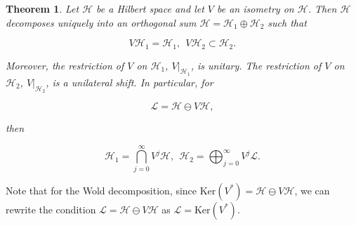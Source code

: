\documentclass[10pt, reqno]{amsart}
\newtheorem{theorem}{Theorem}[section]
\theoremstyle{definition}
\numberwithin{equation}{section}
\begin{document}
\begin{theorem}{}\label{Wold}
    Let $\mathcal{H}$ be a Hilbert space and let $V$ be an isometry on $\mathcal{H}$. Then $\mathcal{H}$ decomposes uniquely into an orthogonal sum $\mathcal{H}=\mathcal{H}_{1}\oplus \mathcal{H}_{2}$ such that

    $$V\mathcal{H}_{1}=\mathcal{H}_{1},~~V\mathcal{H}_{2}\subset \mathcal{H}_{2}.$$

\noindent Moreover, the restriction of $V$ on $\mathcal{H}_{1}$, $V|_{\mathcal{H}_{1}}$, is unitary. The restriction of $V$ on $\mathcal{H}_{2}$, $V|_{\mathcal{H}_{2}}$, is a unilateral shift. In particular, for 

$$\mathcal{L}=\mathcal{H}\ominus V\mathcal{H},$$

\noindent then

$$\mathcal{H}_{1}=\bigcap_{j=0}^{\infty}V^{j}\mathcal{H},~~\mathcal{H}_{2}=\bigoplus_{j=0}^{\infty}V^{j}\mathcal{L}.$$
    
\end{theorem}

\noindent Note that for the Wold decomposition, since $\mathrm{Ker}(V^{*})=\mathcal{H}\ominus V\mathcal{H}$, we can rewrite the condition $\mathcal{L}=\mathcal{H}\ominus V\mathcal{H}$ as $\mathcal{L}=\mathrm{Ker}(V^{*})$.



    

\end{document}
